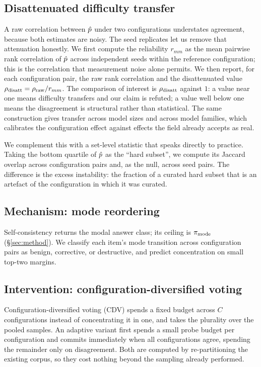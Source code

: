 \subsection{Disattenuated difficulty transfer}
\label{sec:method-transfer}

A raw correlation between $\hat{p}$ under two configurations understates
agreement, because both estimates are noisy. The seed replicates let us remove
that attenuation honestly. We first compute the reliability $r_{mm}$ as the
mean pairwise rank correlation of $\hat{p}$ across independent seeds within the
reference configuration; this is the correlation that measurement noise alone
permits. We then report, for each configuration pair, the raw rank correlation
and the disattenuated value $\rho_{\mathrm{disatt}} = \rho_{\mathrm{raw}} / r_{mm}$. The
comparison of interest is $\rho_{\mathrm{disatt}}$ against $1$: a value near one means
difficulty transfers and our claim is refuted; a value well below one means the
disagreement is structural rather than statistical. The same construction gives
transfer across model sizes and across model families, which calibrates the
configuration effect against effects the field already accepts as real.

We complement this with a set-level statistic that speaks directly to practice.
Taking the bottom quartile of $\hat{p}$ as the ``hard subset'', we compute its
Jaccard overlap across configuration pairs and, as the null, across seed pairs.
The difference is the excess instability: the fraction of a curated hard subset
that is an artefact of the configuration in which it was curated.

\subsection{Mechanism: mode reordering}
\label{sec:method-reorder}

Self-consistency returns the modal answer class; its ceiling is $\pi_{\mathrm{mode}}$
(\S\ref{sec:method}). We classify each item's mode transition across
configuration pairs as benign, corrective, or destructive, and predict
concentration on small top-two margins.

\subsection{Intervention: configuration-diversified voting}
\label{sec:method-cdv}

Configuration-diversified voting (CDV) spends a fixed budget across $C$
configurations instead of concentrating it in one, and takes the plurality over
the pooled samples. An adaptive variant first spends a small probe budget per
configuration and commits immediately when all configurations agree, spending
the remainder only on disagreement. Both are computed by re-partitioning the
existing corpus, so they cost nothing beyond the sampling already performed.

